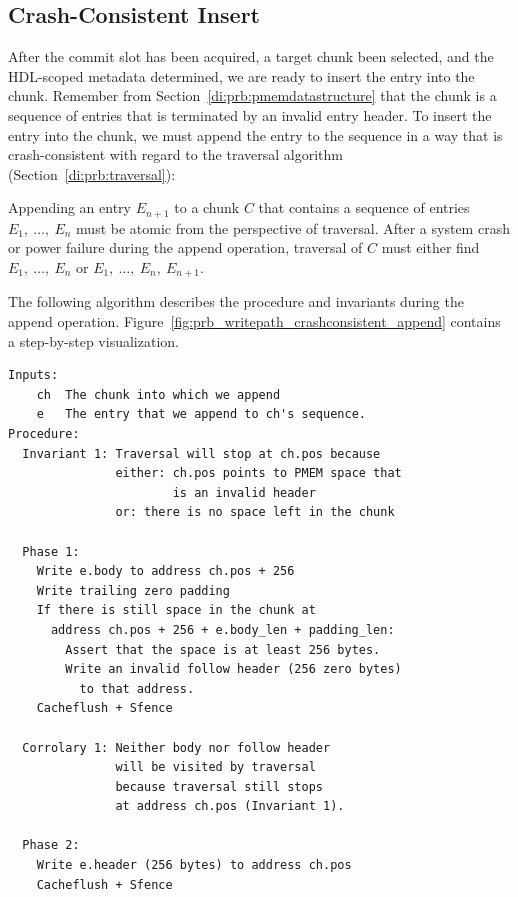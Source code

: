 \documentclass[12pt,a4paper,twoside]{book}
\begin{document}
{\subsection{Crash-Consistent Insert}\label{di:prb:write:crashconsistency}
After the commit slot has been acquired, a target chunk been selected, and the HDL-scoped metadata determined, we are ready to insert the entry into the chunk.
Remember from Section~\ref{di:prb:pmemdatastructure} that the chunk is a sequence of entries that is terminated by an invalid entry header.
To insert the entry into the chunk, we must append the entry to the sequence in a way that is crash-consistent with regard to the traversal algorithm (Section~\ref{di:prb:traversal}):
\begin{displayquote}
    Appending an entry $E_{n+1}$ to a chunk $C$ that contains a sequence of entries $E_1,~\dots,~E_n$ must be atomic from the perspective of traversal.
    After a system crash or power failure during the append operation, traversal of $C$ must either find $E_1,~\dots,~E_n$ or $E_1,~\dots,~E_n,~E_{n+1}$.
\end{displayquote}
The following algorithm describes the procedure and invariants during the append operation.
Figure~\ref{fig:prb_writepath_crashconsistent_append} contains a step-by-step visualization.
\begin{lstlisting}[style=figurepseudocode]
Inputs:
    ch  The chunk into which we append
    e   The entry that we append to ch's sequence.
Procedure:
  Invariant 1: Traversal will stop at ch.pos because
               either: ch.pos points to PMEM space that
                       is an invalid header
               or: there is no space left in the chunk

  Phase 1:
    Write e.body to address ch.pos + 256
    Write trailing zero padding
    If there is still space in the chunk at
      address ch.pos + 256 + e.body_len + padding_len:
        Assert that the space is at least 256 bytes.
        Write an invalid follow header (256 zero bytes)
          to that address.
    Cacheflush + Sfence

  Corrolary 1: Neither body nor follow header
               will be visited by traversal
               because traversal still stops
               at address ch.pos (Invariant 1).

  Phase 2:
    Write e.header (256 bytes) to address ch.pos
    Cacheflush + Sfence


\end{lstlisting}}
\end{document}
